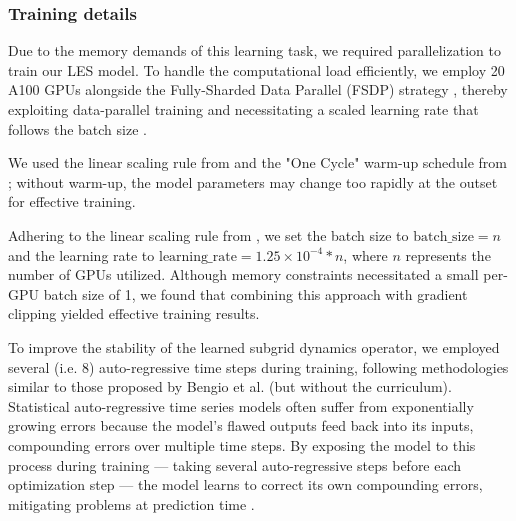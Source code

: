 \subsubsection{Training details}

Due to the memory demands of this learning task, we required parallelization to train our LES model.
To handle the computational load efficiently, we employ 20 A100 GPUs alongside the Fully-Sharded Data Parallel (FSDP) strategy \cite{zhao2023FSDP}, thereby exploiting data-parallel training and necessitating a scaled learning rate that follows the batch size \cite{imagenet1hour2017}.


We used the linear scaling rule from \cite{imagenet1hour2017} and the "One Cycle" warm-up schedule from \cite{smith2019super}; without warm-up, the model parameters may change too rapidly at the outset \cite{imagenet1hour2017} for effective training.

Adhering to the linear scaling rule from \cite{imagenet1hour2017}, we set the batch size to \(\text{batch\_size} = n\) and the learning rate to \(\text{learning\_rate} = 1.25\times10^{-4}*n\), where $n$ represents the number of GPUs utilized. Although memory constraints necessitated a small per-GPU batch size of 1, we found that combining this approach with gradient clipping yielded effective training results.

To improve the stability of the learned subgrid dynamics operator, we employed several (i.e. 8) auto-regressive time steps during training, following methodologies similar to those proposed by Bengio et al. \cite{bengio2015scheduled} (but without the curriculum). Statistical auto-regressive time series models often suffer from exponentially growing errors because the model's flawed outputs feed back into its inputs, compounding errors over multiple time steps. By exposing the model to this process during training — taking several auto-regressive steps before each optimization step — the model learns to correct its own compounding errors, mitigating  problems at prediction time \cite{bengio2015scheduled}.


